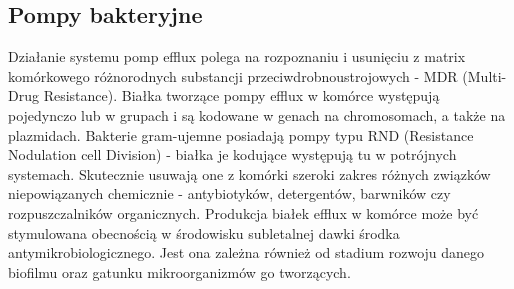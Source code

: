 \documentclass[11pt,a4paper]{report}
\begin{document}
\subsection*{Pompy bakteryjne}
Działanie systemu pomp efflux polega na rozpoznaniu i usunięciu z matrix komórkowego różnorodnych substancji przeciwdrobnoustrojowych - MDR (Multi-Drug Resistance).
Białka tworzące pompy efflux w komórce występują pojedynczo lub w grupach i są kodowane w genach na chromosomach, a także na plazmidach.
Bakterie gram-ujemne posiadają pompy  typu RND (Resistance Nodulation cell Division) - białka je kodujące występują tu w potrójnych systemach. Skutecznie usuwają one z komórki szeroki zakres różnych związków niepowiązanych chemicznie - antybiotyków, detergentów, barwników czy rozpuszczalników organicznych. Produkcja białek efflux w komórce może być stymulowana obecnością w środowisku subletalnej dawki środka antymikrobiologicznego. Jest ona zależna również od stadium rozwoju danego biofilmu oraz gatunku mikroorganizmów go tworzących\cite{czaczyk-myszka, wasaznik, wiercinska}.

\end{document}
